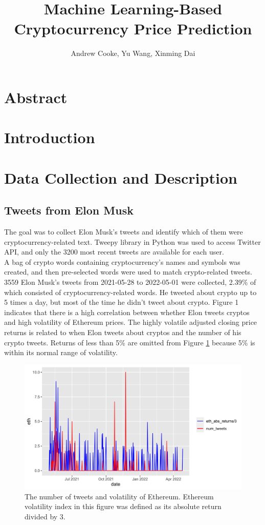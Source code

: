 \documentclass{article}
\title{Machine Learning-Based Cryptocurrency Price Prediction} %
\author{Andrew Cooke, Yu Wang, Xinming Dai}
\begin{document}
\maketitle

\section{Abstract}
\section{Introduction}
	
\section{Data Collection and Description}
\subsection{Tweets from Elon Musk}

The goal was to collect Elon Musk’s tweets and identify which of them were cryptocurrency-related text. Tweepy library in Python was used to access Twitter API, and only the 3200 most recent tweets are available for each user.\\

\noindent A bag of crypto words containing cryptocurrency’s names and symbols was created, and then pre-selected words were used to match crypto-related tweets. 3559 Elon Musk’s tweets from 2021-05-28 to 2022-05-01 were collected, 2.39\% of which consisted of cryptocurrency-related words. He tweeted about crypto up to 5 times a day, but most of the time he didn’t tweet about crypto. Figure 1 indicates that there is a high correlation between whether Elon tweets cryptos and high volatility of Ethereum prices. The highly volatile adjusted closing price returns is related to when Elon tweets about cryptos and the number of his crypto tweets. Returns of less than 5\% are omitted from Figure \ref{fig: tweets_and_returns} because 5\% is within its normal range of volatility.

\begin{figure}[H]
	\centering
	\includegraphics[width=18cm]{../figures/tweets_and_returns.png}
	\caption{The number of tweets and volatility of Ethereum. Ethereum volatility index in this figure was defined as its absolute return divided by 3. }
	\label{fig: tweets_and_returns}
\end{figure}
\end{document}
